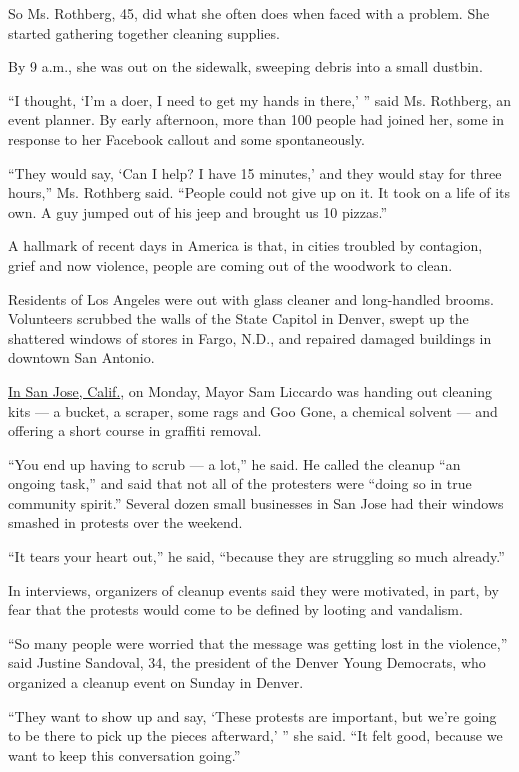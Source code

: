 So Ms. Rothberg, 45, did what she often does when faced with a problem.
She started gathering together cleaning supplies.

By 9 a.m., she was out on the sidewalk, sweeping debris into a small
dustbin.

``I thought, `I'm a doer, I need to get my hands in there,' '' said Ms.
Rothberg, an event planner. By early afternoon, more than 100 people had
joined her, some in response to her Facebook callout and some
spontaneously.

``They would say, `Can I help? I have 15 minutes,' and they would stay
for three hours,'' Ms. Rothberg said. ``People could not give up on it.
It took on a life of its own. A guy jumped out of his jeep and brought
us 10 pizzas.''

A hallmark of recent days in America is that, in cities troubled by
contagion, grief and now violence, people are coming out of the woodwork
to clean.

Residents of Los Angeles were out with glass cleaner and long-handled
brooms. Volunteers scrubbed the walls of the State Capitol in Denver,
swept up the shattered windows of stores in Fargo, N.D., and repaired
damaged buildings in downtown San Antonio.

\href{https://www.nytimes.com/article/california-george-floyd-protests.html}{In
San Jose, Calif.}, on Monday, Mayor Sam Liccardo was handing out
cleaning kits --- a bucket, a scraper, some rags and Goo Gone, a
chemical solvent --- and offering a short course in graffiti removal.

``You end up having to scrub --- a lot,'' he said. He called the cleanup
``an ongoing task,'' and said that not all of the protesters were
``doing so in true community spirit.'' Several dozen small businesses in
San Jose had their windows smashed in protests over the weekend.

``It tears your heart out,'' he said, ``because they are struggling so
much already.''

In interviews, organizers of cleanup events said they were motivated, in
part, by fear that the protests would come to be defined by looting and
vandalism.

``So many people were worried that the message was getting lost in the
violence,'' said Justine Sandoval, 34, the president of the Denver Young
Democrats, who organized a cleanup event on Sunday in Denver.

``They want to show up and say, `These protests are important, but we're
going to be there to pick up the pieces afterward,' '' she said. ``It
felt good, because we want to keep this conversation going.''


